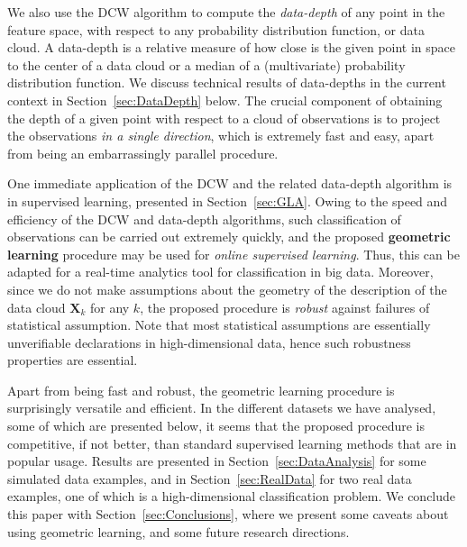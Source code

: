 \documentclass[twoside]{article}
\begin{document}
We also use the DCW algorithm to compute the {\it data-depth} of any point 
in the feature space, with respect to any probability distribution function, or data 
cloud. A data-depth is a relative measure of how close is the given point in space 
to the center 
of a data cloud or a median of a (multivariate) probability distribution function. 
We discuss technical results of data-depths in the current context in 
Section~\ref{sec:DataDepth} below. The crucial 
component of obtaining the 
depth of a given point with respect to a cloud of observations is to project the 
observations {\it in a single direction}, 
which is extremely fast and easy, apart 
from being an embarrassingly parallel procedure. 



One immediate application of the DCW  and the related data-depth algorithm 
is in supervised learning, presented in Section~\ref{sec:GLA}.
Owing to the 
speed and efficiency of the DCW and data-depth algorithms, such classification of 
observations can be carried out extremely quickly, and the proposed 
{\bf geometric learning} procedure may 
be used for {\it online supervised learning}. Thus, this can be adapted for 
a real-time analytics tool
for classification in big data. Moreover, since we do not make assumptions about 
the geometry of the description of the data cloud $\mathbf{X}_{k}$ for any $k$, 
the proposed procedure is {\it robust} against failures of statistical assumption. 
Note that
most statistical assumptions are essentially unverifiable declarations in 
high-dimensional data, hence such robustness properties are essential. 

Apart from being fast and robust, the geometric learning procedure is surprisingly 
versatile and efficient. In the different datasets we have analysed, some 
of which are presented below, 
it seems that the proposed procedure is competitive, if not better, than standard 
supervised learning methods that are in popular usage. 
Results are presented in Section~\ref{sec:DataAnalysis} for some 
simulated data examples, and in Section~\ref{sec:RealData} for two real data examples, one of which 
is a high-dimensional classification problem. We conclude this 
paper with Section~\ref{sec:Conclusions}, where we present some caveats about using 
geometric learning, and some future research directions.




%
\end{document}
